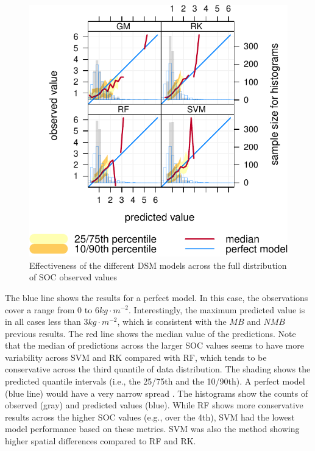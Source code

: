 \documentclass[10pt,b5paper,]{book}
\theoremstyle{definition}
\theoremstyle{definition}
\theoremstyle{definition}
\theoremstyle{remark}
\begin{document}
\begin{figure}
\centering
\includegraphics{SOCMapping_files/figure-latex/condquant-1.pdf}
\caption{\label{fig:condquant}Effectiveness of the different DSM models
across the full distribution of SOC observed values}
\end{figure}

The blue line shows the results for a perfect model. In this case, the
observations cover a range from 0 to \(6 kg \cdot m^{-2}\).
Interestingly, the maximum predicted value is in all cases less than
\(3 kg \cdot m^{-2}\), which is consistent with the \(MB\) and \(NMB\)
previous results. The red line shows the median value of the
predictions. Note that the median of predictions across the larger SOC
values seems to have more variability across SVM and RK compared with
RF, which tends to be conservative across the third quantile of data
distribution. The shading shows the predicted quantile intervals (i.e.,
the 25/75th and the 10/90th). A perfect model (blue line) would have a
very narrow spread \citep{openair}. The histograms show the counts of
observed (gray) and predicted values (blue). While RF shows more
conservative results across the higher SOC values (e.g., over the 4th),
SVM had the lowest model performance based on these metrics. SVM was
also the method showing higher spatial differences compared to RF and
RK.
\end{document}
